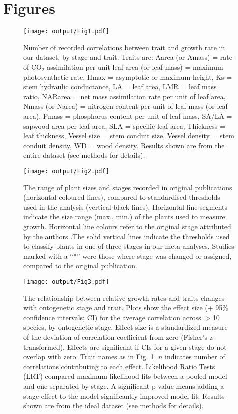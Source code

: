 \documentclass[a4paper,11pt]{article}
\begin{document}
\clearpage
\section*{Figures}

\begin{figure}[h!]
\centering
\texttt{[image: output/Fig1.pdf]}
\caption{Number of recorded correlations between trait and growth rate in our dataset, by stage and trait. Traits are: Aarea (or Amass) = rate of CO$_{2}$ assimilation per unit leaf area (or leaf mass) = maximum photosynthetic rate, Hmax = asymptotic or maximum height,  Ks = stem hydraulic conductance, LA = leaf area, LMR = leaf mass ratio, NARarea = net mass assimilation rate per unit of leaf area, Nmass (or Narea) = nitrogen content per unit of leaf mass (or leaf area), Pmass = phosphorus content per unit of leaf mass, SA/LA = sapwood area per leaf area, SLA = specific leaf area, Thickness = leaf thickness, Vessel size = stem conduit size, Vessel density = stem conduit density, WD = wood density. Results shown are from the entire dataset (see methods for details).}
\label{fig:fig1}
\end{figure}


\begin{figure}[h!]
\centering
\texttt{[image: output/Fig2.pdf]}
\caption{ The range of plant sizes and stages recorded in original publications (horizontal coloured lines), compared to standardised thresholds used in the analysis (vertical black lines). Horizontal line segments indicate the size range (max., min.) of the plants used to measure growth. Horizontal line colours refer to the original stage attributed by the authors .The solid vertical lines indicate the thresholds used to classify plants in one of three stages in our meta-analyses. Studies marked with a “*” were those where stage was changed or assigned, compared to the original publication.}
\label{fig:fig2}
\end{figure}



\begin{figure}[h!]
\centering
\texttt{[image: output/Fig3.pdf]}
\caption{The relationship between relative growth rates and traits changes with ontogenetic stage and trait. Plots show the effect size (+ 95\% confidence intervals; CI) for the average correlation across $>$10 species, by ontogenetic stage. Effect size is a standardized measure of the deviation of correlation coefficient from zero (Fisher's z-transformed). Effects are significant if CIs for a given stage do not overlap with zero. Trait names as in Fig. \ref{fig:fig1}. $n$ indicates number of correlations contributing to each effect. Likelihood Ratio Tests (LRT) compared maximum-likelihood fits between a pooled model and one separated by stage. A significant p-value means adding a stage effect to the model significantly improved model fit. Results shown are from the ideal dataset (see methods for details).}
\label{fig:fig3}
\end{figure}
\end{document}
